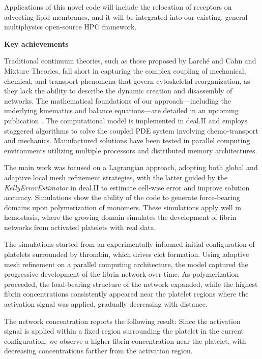 \documentclass[a4paper,12pt, numbers]{article}
\begin{document}
Applications of this novel code will include the relocation of receptors on advecting lipid membranes, and it will be integrated into our existing, general multiphysics open-source HPC framework.

\noindent\textbf{Key achievements}

Traditional continuum theories, such as those proposed by Larché and Cahn and Mixture Theories, fall short in capturing the complex coupling of mechanical, chemical, and transport phenomena that govern cytoskeletal reorganization, as they lack the ability to describe the dynamic creation and disassembly of networks. The mathematical foundations of our approach—including the underlying kinematics and balance equations—are detailed in an upcoming publication \citep{salvadori2025chemo}. The computational model is implemented in deal.II and employs staggered algorithms to solve the coupled PDE system involving chemo-transport and mechanics. Manufactured solutions have been tested in parallel computing environments utilizing multiple processors and distributed memory architectures.

The main work was focused on a Lagrangian approach, adopting both global and adaptive local mesh refinement strategies, with the latter guided by the \textit{KellyErrorEstimator} in deal.II to estimate cell-wise error and improve solution accuracy. Simulations show the ability of the code to generate force-bearing domains upon polymerization of monomers. These simulations apply well in hemostasis, where the growing domain simulates the development of fibrin networks from activated platelets with real data.

The simulations started from an experimentally informed initial configuration of platelets surrounded by thrombin, which drives clot formation. Using adaptive mesh refinement on a parallel computing architecture, the model captured the progressive development of the fibrin network over time. As polymerization proceeded, the load-bearing structure of the network expanded, while the highest fibrin concentrations consistently appeared near the platelet regions where the activation signal was applied, gradually decreasing with distance.

The network concentration reports the following result: Since the activation signal is applied within a fixed region surrounding the platelet in the current configuration, we observe a higher fibrin concentration near the platelet, with decreasing concentrations farther from the activation region.
\end{document}
